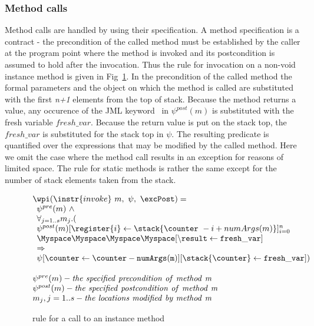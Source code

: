 \subsubsection{Method calls}
Method calls are handled by using their specification. A method specification is a contract - the precondition of the called method
must be established by the caller at the program point where the method is invoked and its postcondition is assumed to hold after the invocation. Thus the rule for
invocation on a non-void instance method is given in Fig~\ref{wpInv}. In the precondition of the called method the formal parameters and the object on which the method is called are substituted with the first \textit{n+1} elements from the top of stack. 
Because the method returns a value, any occurence of the JML keyword \result \ in $\psi^{post}(m)$ is substituted with the fresh variable $fresh\_var$.  
Because the return value is put on the stack top, the $fresh\_var$ is substituted for the stack top in $\psi$. The resulting predicate is quantified over the 
expressions that may be modified by the called method. Here we omit the case where the method call results in an exception for reasons of limited space. 
The rule for static methods is rather the same except for the number of stack elements taken from the stack.  

\begin{figure}[!ht]
$$
\begin{array}{l}
\wpi(\instr{invoke} \ m, \ \psi ,\ \excPost) =\\ 
\begin{array}{l}
\psi^{pre}(m) \ \wedge \\
 \forall_{j = 1..s} m_{j}.( \\
\psi^{post}(m)[\register{i}  \leftarrow \stack{\counter \ - i + numArgs(m)}]_{i=0}^n  \\
\Myspace \Myspace\Myspace \Myspace[\tt{\backslash result} \leftarrow fresh\_var] \\
\Rightarrow \\
 \psi[\counter \leftarrow \counter - \tt{numArgs}(m)][\stack{\counter }  \leftarrow \tt{fresh\_var}]) \\
\end{array} \\[15 mm]
\psi^{pre}(m) - \it{ the \ specified \ precondition \ of \ method \ m} \\
\psi^{post}(m) - \it{the \ specified \ postcondition \ of \ method \ m} \\
m_{j} , j = 1 .. s - \it{ the \ locations \ modified \ by \ method \ m}
\end{array}
$$
\caption{\wpi \ rule for a call to an instance method}
\label{wpInv}
\end{figure}
